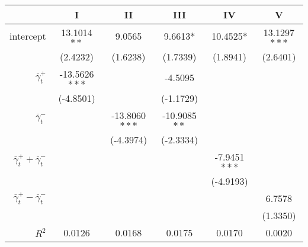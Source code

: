 \begin{tabular}{rSSSSS}
\toprule
{} &              I &             II &           III &            IV &             V \\
\midrule
intercept &    13.1014$**$ &         9.0565 &     9.6613$*$ &    10.4525$*$ &  13.1297$***$ \\
          &       (2.4232) &       (1.6238) &      (1.7339) &      (1.8941) &      (2.6401) \\
$\overline \gamma^+_t$       &  -13.5626$***$ &                &       -4.5095 &               &               \\
          &      (-4.8501) &                &     (-1.1729) &               &               \\
$\overline \gamma^-_t$       &                &  -13.8060$***$ &  -10.9085$**$ &               &               \\
          &                &      (-4.3974) &     (-2.3334) &               &               \\
$\overline \gamma^+_t + \overline \gamma^-_t$   &                &                &               &  -7.9451$***$ &               \\
          &                &                &               &     (-4.9193) &               \\
$\overline \gamma^+_t - \overline \gamma^-_t$  &                &                &               &               &        6.7578 \\
          &                &                &               &               &      (1.3350) \\
\midrule
$R^2$ & 0.0126 & 0.0168 & 0.0175 & 0.0170 & 0.0020\\\bottomrule
\end{tabular}

